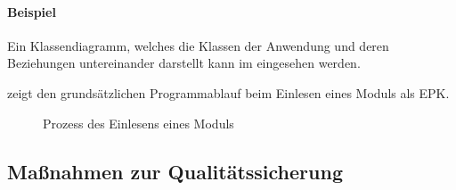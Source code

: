 \paragraph{Beispiel}
Ein Klassendiagramm, welches die Klassen der Anwendung und deren Beziehungen untereinander darstellt kann im  eingesehen werden.

 zeigt den grundsätzlichen Programmablauf beim Einlesen eines Moduls als \ac{EPK}.
\begin{figure}[htb]
\centering
{}
\caption{Prozess des Einlesens eines Moduls}
\label{fig:Modulimport}
\end{figure}


\subsection{Maßnahmen zur Qualitätssicherung}
\label{sec:Qualitaetssicherung}










